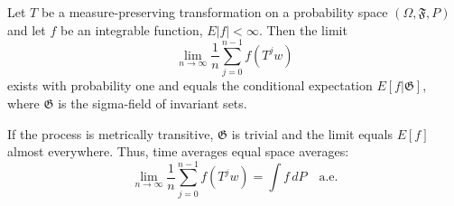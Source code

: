 Let $T$ be a measure-preserving transformation on a probability space $(\Omega, \mathfrak{F}, P)$ and let $f$ be an integrable function, $E|f| < \infty$. Then the limit
$$\lim_{n \to \infty} \frac{1}{n} \sum_{j=0}^{n-1} f(T^j w)$$
exists with probability one and equals the conditional expectation $E[f|\mathfrak{G}]$, where $\mathfrak{G}$ is the sigma-field of invariant sets.

If the process is metrically transitive, $\mathfrak{G}$ is trivial and the limit equals $E[f]$ almost everywhere. Thus, time averages equal space averages:
$$\lim_{n \to \infty} \frac{1}{n} \sum_{j=0}^{n-1} f(T^j w) = \int f \, dP \quad \text{a.e.}$$

